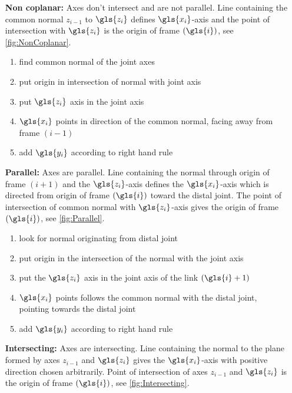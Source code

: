 \begin{itemize}[wide=\parindent] %
	\item[\textbf{Non coplanar:}] Axes don't intersect and are not parallel. Line containing the common normal $z_{i-1}$ to $\gls{z_i}$ defines $\gls{x_i}$-axis and the point of intersection with $\gls{z_i}$ is the origin of frame $(\gls{i})$, see \ref{fig:NonCoplanar}.
	\begin{enumerate}[label=\emph{\alph*)}]
		\item find common normal of the joint axes
		\item put origin in intersection of normal with joint axis
		\item put $\gls{z_i}$ axis in the joint axis
		\item $\gls{x_i}$ points in direction of the common normal, facing away from frame $(i-1)$
		\item add $\gls{y_i}$ according to right hand rule
	\end{enumerate}
	\item[\textbf{Parallel:}] Axes are parallel. Line containing the normal through origin of frame $(i+1)$ and the $\gls{z_i}$-axis defines the $\gls{x_i}$-axis which is directed from origin of frame $(\gls{i})$ toward the distal joint. The point of intersection of common normal with $\gls{z_i}$-axis gives the origin of frame $(\gls{i})$, see \ref{fig:Parallel}. %
	\begin{enumerate}[label=\emph{\alph*)}]
		\item look for normal originating from distal joint
		\item put origin in the intersection of the normal with the joint axis
		\item put the $\gls{z_i}$ axis in the joint axis of the link $(\gls{i}+1)$ 
		\item $\gls{x_i}$ points follows the common normal with the distal joint, pointing towards the distal joint
		\item add $\gls{y_i}$ according to right hand rule
	\end{enumerate}
	\item[\textbf{Intersecting:}] Axes are intersecting. Line containing the normal to the plane formed by axes $z_{i-1}$ and  $\gls{z_i}$ gives the $\gls{x_i}$-axis with positive direction chosen arbitrarily. Point of intersection of  axes $z_{i-1}$  and  $\gls{z_i}$ is the origin of frame $(\gls{i})$, see \ref{fig:Intersecting}.

\end{itemize}
